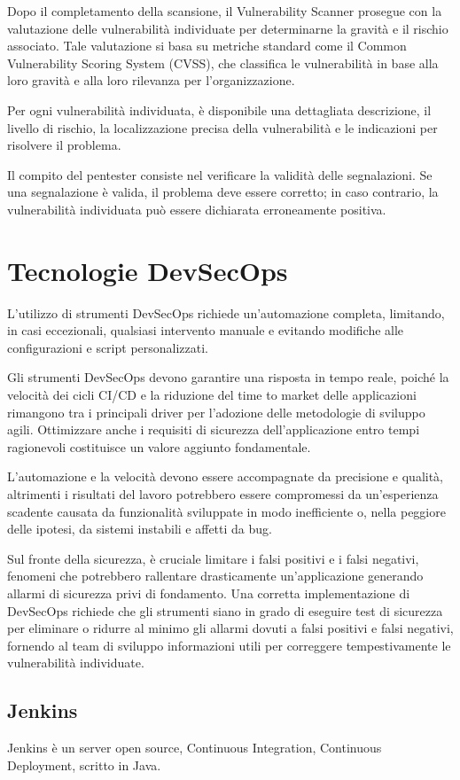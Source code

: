 Dopo il completamento della scansione, il Vulnerability Scanner prosegue con la valutazione delle vulnerabilità individuate per determinarne la gravità e il rischio associato. Tale valutazione si basa su metriche standard come il Common Vulnerability Scoring System (CVSS), che classifica le vulnerabilità in base alla loro gravità e alla loro rilevanza per l'organizzazione.

Per ogni vulnerabilità individuata, è disponibile una dettagliata descrizione, il livello di rischio, la localizzazione precisa della vulnerabilità e le indicazioni per risolvere il problema.

Il compito del pentester consiste nel verificare la validità delle segnalazioni. Se una segnalazione è valida, il problema deve essere corretto; in caso contrario, la vulnerabilità individuata può essere dichiarata erroneamente positiva.
\section{Tecnologie DevSecOps}
L'utilizzo di strumenti DevSecOps richiede un'automazione completa, limitando, in casi eccezionali, qualsiasi intervento manuale e evitando modifiche alle configurazioni e script personalizzati. 

Gli strumenti DevSecOps devono garantire una risposta in tempo reale, poiché la velocità dei cicli CI/CD e la riduzione del time to market delle applicazioni rimangono tra i principali driver per l'adozione delle metodologie di sviluppo agili. Ottimizzare anche i requisiti di sicurezza dell'applicazione entro tempi ragionevoli costituisce un valore aggiunto fondamentale.

L'automazione e la velocità devono essere accompagnate da precisione e qualità, altrimenti i risultati del lavoro potrebbero essere compromessi da un'esperienza scadente causata da funzionalità sviluppate in modo inefficiente o, nella peggiore delle ipotesi, da sistemi instabili e affetti da bug.

Sul fronte della sicurezza, è cruciale limitare i falsi positivi e i falsi negativi, fenomeni che potrebbero rallentare drasticamente un'applicazione generando allarmi di sicurezza privi di fondamento. Una corretta implementazione di DevSecOps richiede che gli strumenti siano in grado di eseguire test di sicurezza per eliminare o ridurre al minimo gli allarmi dovuti a falsi positivi e falsi negativi, fornendo al team di sviluppo informazioni utili per correggere tempestivamente le vulnerabilità individuate.
\subsection{Jenkins}
Jenkins è un server open source, Continuous Integration, Continuous Deployment, scritto in Java. 

